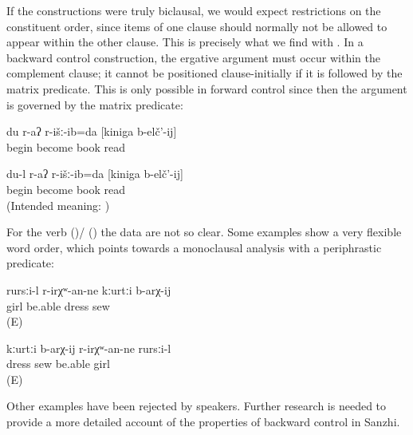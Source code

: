 If the constructions were truly biclausal, we would expect restrictions on the constituent order, since items of one clause should normally not be allowed to appear within the other clause. This is precisely what we find with . In a backward control construction, the ergative argument must occur within the complement clause; it cannot be positioned clause-initially if it is followed by the matrix predicate. This is only possible in forward control since then the argument is governed by the matrix predicate:
%
\begin{exe}
	\ex	\label{ex:‎I began to read the book}
	\gll	du	r-aʔ	r-išː-ib=da	[kiniga	b-elč'-ij]\\
			\tsc{f-}begin	become	book	read\\
	\glt	{}

	\ex	\label{ex:I began to read the book ungrammatical}
	\gll	{*} 	du-l	r-aʔ	r-išː-ib=da	[kiniga	b-elč'-ij]\\
		{}		\tsc{f-}begin	become	book	read\\
	\glt	‎ (Intended meaning: )
\end{exe}

For the verb   ()\slash{} ()  the data are not so clear. Some examples show a very flexible word order, which points towards a monoclausal analysis with a periphrastic predicate:
%
\begin{exe}
	\ex
	\gll	rursːi-l	r-irχʷ-an-ne kːurtːi	b-arχ-ij \\
		girl	be.able	dress	sew\\
	\glt	{} (E)

	\ex
	\gll	kːurtːi	b-arχ-ij	r-irχʷ-an-ne	rursːi-l\\
		dress	sew	be.able	girl\\
	\glt	{} (E)
\end{exe}

Other examples have been rejected by speakers. Further research is needed to provide a more detailed account of the properties of backward control in Sanzhi.




